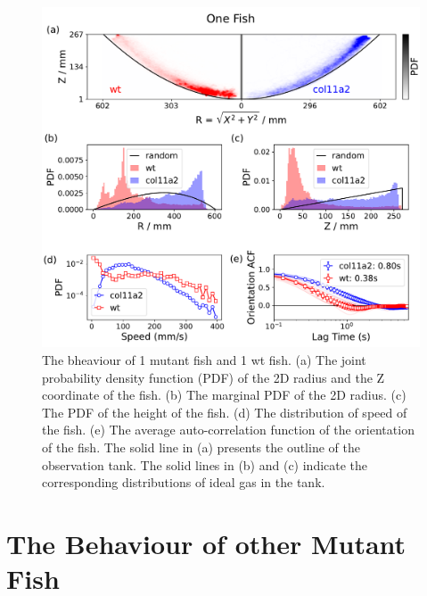 \documentclass[11pt,twoside]{report}
\begin{document}
\begin{figure}
  \includegraphics[width=\linewidth]{figOneFish}
  \caption[The behaviour of one mutant fish and one wildtype fish]{\label{fig:one_fish_mutant}
  	The bheaviour of 1 mutant fish and 1 wt fish.
  	(a) The joint probability density function (PDF) of the 2D radius and the Z coordinate of the fish.
  	(b) The marginal PDF of the 2D radius. 
  	(c) The PDF of the height of the fish.
  	(d) The distribution of speed of the fish.
  	(e) The average auto-correlation function of the orientation of the fish.
  	The solid line in (a) presents the outline of the observation tank. The solid lines in (b) and (c) indicate the corresponding distributions of ideal gas in the tank.
  }
\end{figure}



\section{The Behaviour of other Mutant Fish} 
\end{document}
